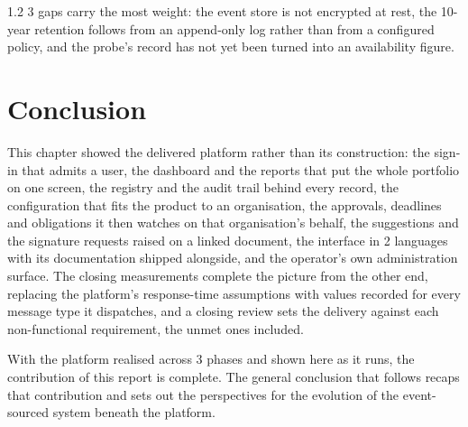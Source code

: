 \begin{spacing}{1.2}
3 gaps carry the most weight: the event store is not encrypted at rest,
the 10-year retention follows from an append-only log rather than from a
configured policy, and the probe's record has not yet been turned into
an availability figure.

\section*{Conclusion}
This chapter showed the delivered platform rather than its construction:
the sign-in that admits a user, the dashboard and the reports that put
the whole portfolio on one screen, the registry and the audit trail
behind every record, the configuration that fits the product to an
organisation, the approvals, deadlines and obligations it then watches
on that organisation's behalf, the suggestions and the signature
requests raised on a linked document, the interface in 2 languages with
its documentation shipped alongside, and the operator's own
administration surface. The closing measurements complete the
picture from the other end, replacing the platform's response-time
assumptions with values recorded for every message type it dispatches,
and a closing review sets the delivery against each non-functional
requirement, the unmet ones included.

With the platform realised across 3 phases and shown here as it runs,
the contribution of this report is complete. The general conclusion that
follows recaps that contribution and sets out the perspectives for the
evolution of the event-sourced system beneath the platform.

\end{spacing}
